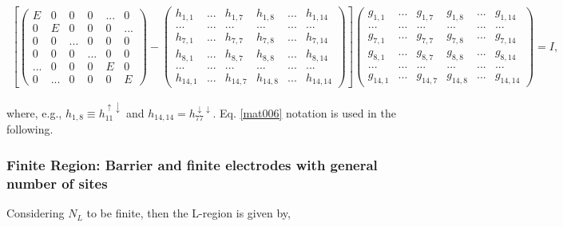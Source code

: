 \documentclass[10pt,prb,showpacs,amssymb,floatfix]{revtex4-1}
\newcommand{\dna}{\downarrow}
\newcommand{\upa}{\uparrow}
\begin{document}
\begin{align}
 \left[ \left(\begin{array}{cccccc} 
E    &  0 & 0 &  0 & ... &  0  \\
0    &  E & 0 &  0 & 0 &  ...  \\
0    & 0  & ... &  0 & 0 &  0  \\
0    & 0  & 0 &  ... & 0 &  0  \\
...    & 0  & 0 &  0 & E &  0  \\
0    & ...  & 0 &  0 & 0 &  E 
\end{array}\right) -
 \left(\begin{array}{cccccc} 
h_{1,1}   &  ... & h_{1,7} & h_{1,8}  & ... &h_{1,14}   \\
... &  ... & ...  & ... & ... & ... \\
 h_{7,1} & ... &  h_{7,7} &  h_{7,8} & ... & h_{7,14}   \\
  h_{8,1} & ... & h_{8,7} & h_{8,8} & ... & h_{8,14}  \\
... &  ... & ...  & ... & ... & ...  \\
h_{14,1} & ... &  h_{14,7} &  h_{14,8} & ... & h_{14,14}  
\end{array}\right) \right] 
 \left(\begin{array}{ccccccc} 
g_{1,1}   &  ... & g_{1,7} & g_{1,8}  & ... & g_{1,14}   \\
... &  ... & ...  & ... & ... & ... \\
 g_{7,1} & ... &  g_{7,7} &  g_{7,8} & ... & g_{7,14}   \\
  g_{8,1} & ... & g_{8,7} & g_{8,8} & ... & g_{8,14}  \\
... &  ... & ...  & ... & ... & ...  \\
g_{14,1} & ... &  g_{14,7} &  g_{14,8} & ... & g_{14,14}  \end{array}\right) =  
I,
\label{mat006}
\end{align}


where, e.g., $h_{1,8}\equiv h^{\upa\dna}_{11} $ and $ h_{14,14}  =h^{\dna\dna}_{77}.$ Eq. \eqref{mat006} notation is used in the following.

\subsubsection{Finite Region: Barrier and finite electrodes with general number of sites}

Considering $N_L$ to be finite, then the L-region is given by,
\end{document}
